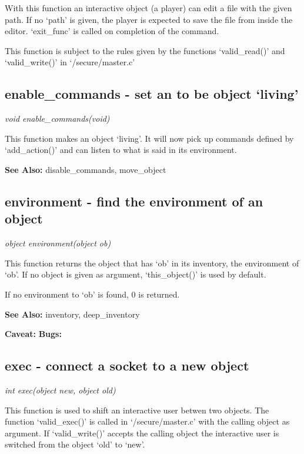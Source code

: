     With this function an interactive object (a player) can edit
    a file with the given path. If no `path' is given, the player
    is expected to save the file from inside the editor. `exit\_func' 
    is called on completion of the command.

    This function is subject to the rules given by the functions
    `valid\_read()' and `valid\_write()' in `/secure/master.c'



\subsection{enable\_commands - set an to be object `living'}

    {\em void enable\_commands(void)}

    This function makes an object `living'. It will now pick up
    commands defined by `add\_action()' and can listen to what is
    said in its environment.

    {\bf See Also: }    disable\_commands, move\_object



\subsection{environment - find the environment of an object}

    {\em object environment(object ob)}

    This function returns the object that has `ob' in its inventory, 
    the environment of `ob'. If no object is given as argument,
    `this\_object()' is used by default.

    If no environment to `ob' is found, 0 is returned.

    {\bf See Also: }    inventory, deep\_inventory

    {\bf Caveat: }
    {\bf Bugs: }

\subsection{exec - connect a socket to a new object}

    {\em int exec(object new, object old)}

    This function is used to shift an interactive user betwen two
    objects. The function `valid\_exec()' is called in `/secure/master.c'
    with the calling object as argument. If `valid\_write()' accepts
    the calling object the interactive user is switched from the object
    `old' to `new'.

